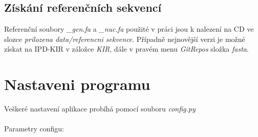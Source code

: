 \documentclass[czech,DP]{thesiskiv}
\numberwithin{equation}{section}
\begin{document}
\subsection{Získání referenčních sekvencí}
\label{sec:ref_sek}
Referenční soubory \textit{\_gen.fa} a \textit{\_nuc.fa} použité v práci jsou k nalezení na CD ve slozce \textit{prilozena data/referencni sekvence}. Případně nejnovější verzi je možné získat na IPD-KIR \cite{imgt_hla_database} v záložce \textit{KIR}, dále v pravém menu \textit{GitRepos} složka \textit{fasta}.

\section{Nastaveni programu}
Veškeré nastavení aplikace probíhá pomocí souboru \textit{config.py}
\\
\\
\noindent
Parametry configu:
\end{document}
